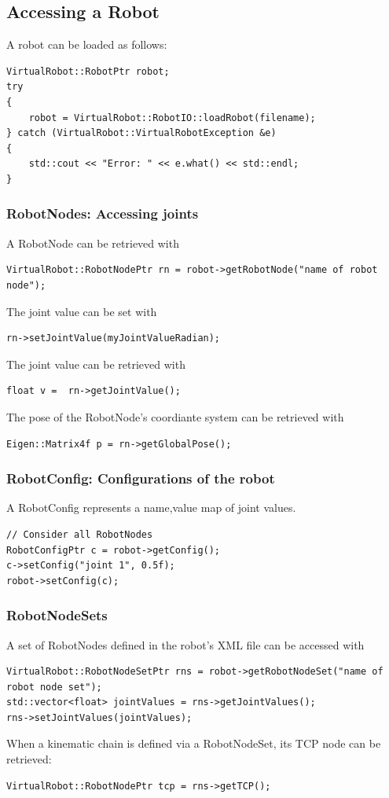 \subsection{Accessing a Robot}
A robot can be loaded as follows:
\begin{lstlisting}
VirtualRobot::RobotPtr robot;
try
{
    robot = VirtualRobot::RobotIO::loadRobot(filename);
} catch (VirtualRobot::VirtualRobotException &e)
{
    std::cout << "Error: " << e.what() << std::endl;
}
\end{lstlisting}
\subsubsection{RobotNodes: Accessing joints}
A RobotNode can be retrieved with
\begin{lstlisting}
VirtualRobot::RobotNodePtr rn = robot->getRobotNode("name of robot node");
\end{lstlisting}
The joint value can be set with 
\begin{lstlisting}
rn->setJointValue(myJointValueRadian);
\end{lstlisting}
The joint value can be retrieved with
\begin{lstlisting}
float v =  rn->getJointValue();
\end{lstlisting}
The pose of the RobotNode's coordiante system can be retrieved with
\begin{lstlisting}
Eigen::Matrix4f p = rn->getGlobalPose();
\end{lstlisting}
\subsubsection{RobotConfig: Configurations of the robot}
A RobotConfig represents a name,value map of joint values.
\begin{lstlisting}
// Consider all RobotNodes
RobotConfigPtr c = robot->getConfig();
c->setConfig("joint 1", 0.5f);
robot->setConfig(c);
\end{lstlisting}
\subsubsection{RobotNodeSets}
A set of RobotNodes defined in the robot's XML file can be accessed with
\begin{lstlisting}
VirtualRobot::RobotNodeSetPtr rns = robot->getRobotNodeSet("name of robot node set");
std::vector<float> jointValues = rns->getJointValues();
rns->setJointValues(jointValues);
\end{lstlisting}
When a kinematic chain is defined via a RobotNodeSet, its TCP node can be retrieved: 
\begin{lstlisting}
VirtualRobot::RobotNodePtr tcp = rns->getTCP();
\end{lstlisting}
